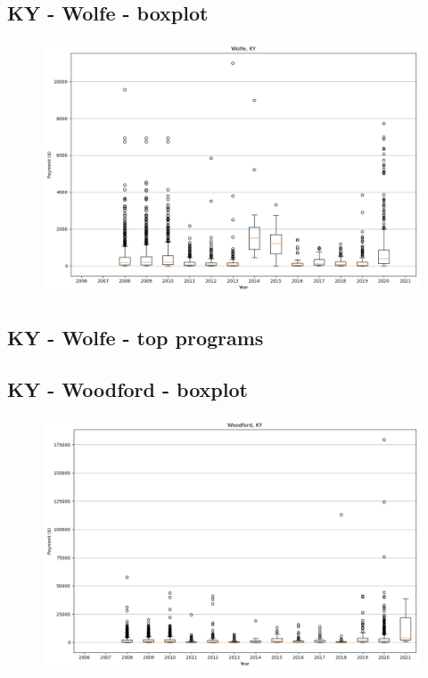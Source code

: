 \subsection*{KY - Wolfe - boxplot}
\begin{figure}[h]
\centering
\includegraphics[width=7in]{../output/boxplots/counties/Wolfe-KY_boxplot.png}
\end{figure}


\subsection*{KY - Wolfe - top programs}

\newpage
\subsection*{KY - Woodford - boxplot}
\begin{figure}[h]
\centering
\includegraphics[width=7in]{../output/boxplots/counties/Woodford-KY_boxplot.png}
\end{figure}


